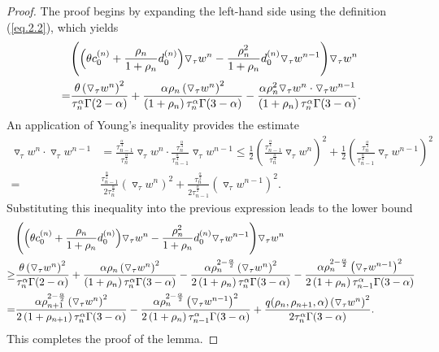 \documentclass{siamart171218}
\theoremstyle{remark}
\theoremstyle{example}
\numberwithin{equation}{section}
\begin{document}
\begin{proof}
The proof begins by expanding the left-hand side using the definition (\ref{eq.2.2}), which yields
\begin{align*}
& \Bigg{(} \Big{(} \theta c_{0}^{(n)}+ \frac{\rho_{n}}{1+\rho_{n}}d_{0}^{(n)} \Big{)} \triangledown_\tau w^{n}
-\frac{\rho_{n}^2}{1+\rho_{n}}d_{0}^{(n)} \triangledown_\tau w^{n-1} \Bigg{)} \triangledown_\tau w^{n} \\
= & \frac{\theta \left(\triangledown_\tau w^{n} \right)^2 }{\tau_{n}^\alpha \Gamma(2-\alpha)} +\frac{\alpha \rho_{n} \left( \triangledown_\tau w^{n} \right)^2}{ \left(1+\rho_{n}\right)\tau_{n}^\alpha \Gamma(3-\alpha)} -\frac{\alpha \rho_{n}^2 \triangledown_\tau w^{n}\cdot \triangledown_\tau w^{n-1} }{ \left(1+\rho_{n}\right)\tau_{n}^\alpha \Gamma(3-\alpha)}.
\end{align*}
An application of Young's inequality provides the estimate
\begin{align*}
	\triangledown_\tau w^{n}\cdot \triangledown_\tau w^{n-1}
	&=\frac{\tau_{n-1}^{\frac{\alpha}{4}}}{\tau_{n}^{\frac{\alpha}{4}}}\triangledown_\tau w^{n}\cdot \frac{\tau_{n}^{\frac{\alpha}{4}}}
	{\tau_{n-1}^{\frac{\alpha}{4}}}\triangledown_\tau w^{n-1}
   \leq \frac{1}{2} \left( \frac{\tau_{n-1}^{\frac{\alpha}{4}}}
   {\tau_{n}^{\frac{\alpha}{4}}}\triangledown_\tau w^{n}\right)^2 +\frac{1}{2} \left( \frac{\tau_{n}^{\frac{\alpha}{4}}}
   {\tau_{n-1}^{\frac{\alpha}{4}}}\triangledown_\tau w^{n-1} \right)^2 \\
   =&\frac{\tau_{n-1}^{\frac{\alpha}{2}}}
   {2\tau_{n}^{\frac{\alpha}{2}}}
   \left( \triangledown_\tau w^{n} \right)^2 +\frac{\tau_{n}^{\frac{\alpha}{2}}}{2\tau_{n-1}^{\frac{\alpha}{2}}} \left( \triangledown_\tau w^{n-1} \right)^2.
\end{align*}
Substituting this inequality into the previous expression leads to the lower bound
\begin{align*}
& \Bigg{(} \Big{(} \theta c_{0}^{(n)}+ \frac{\rho_{n}}{1+\rho_{n}}d_{0}^{(n)} \Big{)} \triangledown_\tau w^{n}
-\frac{\rho_{n}^2}{1+\rho_{n}}d_{0}^{(n)} \triangledown_\tau w^{n-1} \Bigg{)} \triangledown_\tau w^{n} \\
\ge & \frac{\theta \left(\triangledown_\tau w^{n} \right)^2 }{\tau_{n}^\alpha \Gamma(2-\alpha)}+\frac{\alpha \rho_{n} \left(\triangledown_\tau w^{n} \right)^2}
{ \left(1+\rho_{n}\right)\tau_{n}^\alpha \Gamma(3-\alpha)} -\frac{\alpha \rho_{n}^{2-\frac{\alpha}{2}} \left(\triangledown_\tau w^{n} \right)^2 }{ 2 \left(1+\rho_{n}\right)\tau_{n}^\alpha \Gamma(3-\alpha)} -\frac{\alpha \rho_{n}^{2-\frac{\alpha}{2}} \left(\triangledown_\tau w^{n-1} \right)^2 }{ 2 \left(1+\rho_{n}\right)\tau_{n-1}^\alpha \Gamma(3-\alpha)} \\
= &\frac{\alpha \rho_{n+1}^{2-\frac{\alpha}{2}} \left(\triangledown_\tau w^{n} \right)^2}{2 \left(1+\rho_{n+1}\right)\tau_{n}^\alpha \Gamma(3-\alpha)} -\frac{\alpha \rho_{n}^{2-\frac{\alpha}{2}} \left(\triangledown_\tau w^{n-1} \right)^2}{2 \left(1+\rho_{n}\right)\tau_{n-1}^\alpha \Gamma(3-\alpha)}+\frac{q(\rho_n,\rho_{n+1},\alpha) \left(\triangledown_\tau w^{n} \right)^2}{2\tau_{n}^\alpha \Gamma(3-\alpha)}.
\end{align*}
This completes the proof of the lemma.
\end{proof}
\end{document}
